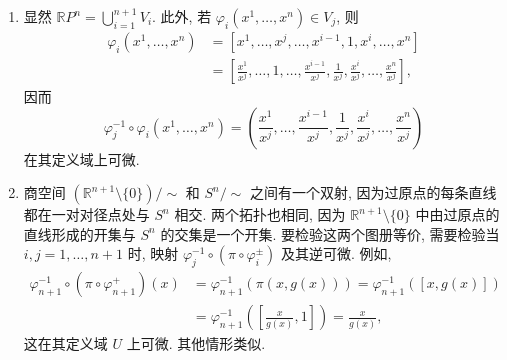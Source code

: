 \begin{description}[font=\normalfont,leftmargin=2em,labelwidth=1.5em]
\begin{enumerate}[label=(\alph*),ref=\alph*,leftmargin=*]
\item 显然 $\mathbb{R}P^n=\bigcup_{i=1}^{n+1} V_i$. 此外, 若 $\varphi_i(x^1,\ldots,x^n)\in V_j$, 则
\begin{align*}
  \varphi_i(x^1,\ldots,x^n)
  &=[x^1,\ldots,x^j,\ldots,x^{i-1},1,x^i,\ldots,x^n]\\
  &=\left[\frac{x^1}{x^j},\ldots,1,\ldots,\frac{x^{i-1}}{x^j},\frac{1}{x^j},\frac{x^i}{x^j},\ldots,\frac{x^n}{x^j}\right],
\end{align*}
因而
\[
  \varphi_j^{-1}\circ\varphi_i(x^1,\ldots,x^n)
  =\left(\frac{x^1}{x^j},\ldots,\frac{x^{i-1}}{x^j},\frac{1}{x^j},\frac{x^i}{x^j},\ldots,\frac{x^n}{x^j}\right)
\]
在其定义域上可微.
\item 商空间 $(\mathbb{R}^{n+1}\setminus\{0\})/{\sim}$ 和 $S^n/{\sim}$ 之间有一个双射, 因为过原点的每条直线都在一对对径点处与 $S^n$ 相交. 两个拓扑也相同, 因为 $\mathbb{R}^{n+1}\setminus\{0\}$ 中由过原点的直线形成的开集与 $S^n$ 的交集是一个开集. 要检验这两个图册等价, 需要检验当 $i,j=1,\ldots,n+1$ 时, 映射 $\varphi_j^{-1}\circ(\pi\circ\varphi_i^\pm)$ 及其逆可微. 例如,
\begin{align*}
  \varphi_{n+1}^{-1}\circ(\pi\circ\varphi_{n+1}^+)(x)
  &=\varphi_{n+1}^{-1}(\pi(x,g(x)))
  =\varphi_{n+1}^{-1}([x,g(x)])\\
  &=\varphi_{n+1}^{-1}\left(\left[\frac{x}{g(x)},1\right]\right)
  =\frac{x}{g(x)},
\end{align*}
这在其定义域 $U$ 上可微. 其他情形类似.
\end{enumerate}
\end{description}
